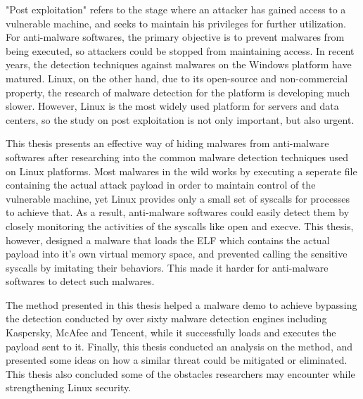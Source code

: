 "Post exploitation" refers to the stage where an attacker has gained access to a vulnerable machine, and seeks to maintain
his privileges for further utilization. For anti-malware softwares, the primary objective is to prevent malwares from being
executed, so attackers could be stopped from maintaining access. In recent years, the detection techniques against malwares on the Windows platform have matured.
Linux, on the other hand, due to its open-source and non-commercial property, the research of malware detection for the
platform is developing much slower. However, Linux is the most widely used platform for servers and data centers, so the
study on post exploitation is not only important, but also urgent.

This thesis presents an effective way of hiding malwares from anti-malware softwares after researching into the common
malware detection techniques used on Linux platforms. Most malwares in the wild works by executing a seperate file
containing the actual attack payload in order to maintain control of the vulnerable machine, yet Linux provides only a
small set of syscalls for processes to achieve that. As a result, anti-malware softwares could easily detect them by closely
monitoring the activities of the syscalls like open and execve. This thesis, however, designed a malware that loads
the ELF which contains the actual payload into it's own virtual memory space, and prevented calling the sensitive syscalls
by imitating their behaviors. This made it harder for anti-malware softwares to detect such malwares.

The method presented in this thesis helped a malware demo to achieve bypassing the detection conducted by over sixty
malware detection engines including Kaspersky, McAfee and Tencent, while it successfully loads and executes the payload
sent to it. Finally, this thesis conducted an analysis on the method, and presented some ideas on how a similar threat could be
mitigated or eliminated. This thesis also concluded some of the obstacles researchers may encounter while strengthening
Linux security.
